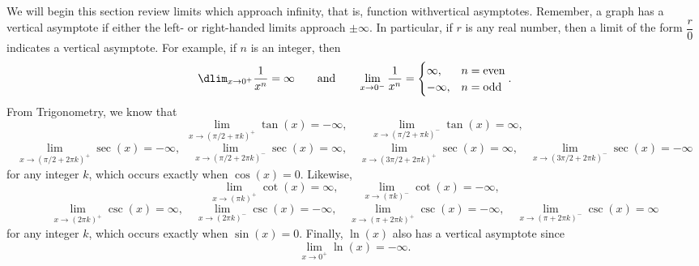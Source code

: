 \documentclass{book}
\begin{document}
We will begin this section review limits which approach infinity, that is, function withvertical asymptotes. Remember, a graph has a vertical asymptote if either the left- or right-handed limits approach $\pm\infty$. In particular, if $r$ is any real number, then a limit of the form $\dfrac{r}{0}$ indicates a vertical asymptote. For example, if $n$ is an integer, then
\[\dlim_{x\to 0^+} \dfrac{1}{x^n} = \infty \qquad\text{and} \qquad \lim_{x\to 0^-} \dfrac{1}{x^n} = \begin{cases} \infty, & n=\text{even}\\ -\infty, & n=\text{odd}\end{cases}.\] From Trigonometry, we know that 
\[\lim_{x\to (\pi/2 + \pi k)^+} \tan(x) = -\infty, \qquad \lim_{x\to (\pi/2 + \pi k)^-} \tan(x) = \infty,\] \[\lim_{x\to (\pi/2 + 2\pi k)^+} \sec(x) = -\infty,\quad \lim_{x\to (\pi/2 + 2\pi k)^-} \sec(x) = \infty, \quad \lim_{x\to (3\pi/2 + 2\pi k)^+} \sec(x) = \infty,\quad \lim_{x\to (3\pi/2 + 2\pi k)^-} \sec(x) = -\infty\] for any integer $k$, which occurs exactly when $\cos(x) = 0$. Likewise, \[\lim_{x\to (\pi k)^+} \cot(x) = \infty, \qquad \lim_{x\to (\pi k)^-} \cot(x) = -\infty,\] \[\lim_{x\to (2\pi k)^+} \csc(x) = \infty,\quad \lim_{x\to (2\pi k)^-} \csc(x) = -\infty, \quad \lim_{x\to (\pi + 2\pi k)^+} \csc(x) = -\infty,\quad \lim_{x\to (\pi + 2\pi k)^-} \csc(x) = \infty\] for any integer $k$, which occurs exactly when $\sin(x) = 0$.  Finally, $\ln(x)$ also has a vertical asymptote since 
\[\lim_{x\to 0^+} \ln(x) = -\infty.\]
\end{document}
